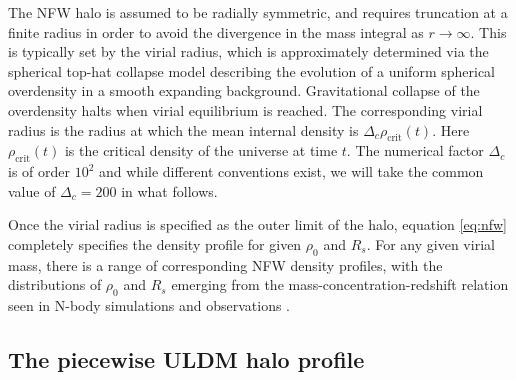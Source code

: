 \documentclass[a4paper,11pt]{article}
\begin{document}
The NFW halo is assumed to be radially symmetric, and requires truncation at a finite radius in order to avoid the divergence in the mass integral as $r\rightarrow \infty$. This is typically set by the virial radius, which is approximately determined via the spherical top-hat collapse model \cite{White:2000jv, Suto:2015jdt, Herrera:2017epn} describing the evolution of a uniform spherical overdensity in a smooth expanding background. Gravitational collapse of the overdensity halts when virial equilibrium is reached. The corresponding virial radius is the radius at which the mean internal density is $\Delta_c \rho_\mathrm{crit}(t)$. Here $\rho_\mathrm{crit}(t)$ is the critical density of the universe at time $t$. The numerical factor $\Delta_c$ is of order $10^2$ and while different conventions exist, we will take the common value of $\Delta_c = 200$ \cite{Richings:2018} in what follows. 

Once the virial radius is specified as the outer limit of the halo, equation \ref{eq:nfw} completely specifies the density profile for given  $\rho_0$ and $R_s$. For any given virial mass, there is a range of corresponding NFW density profiles, with the distributions of $\rho_0$ and $R_s$ emerging from the mass-concentration-redshift relation seen in N-body simulations and observations \cite{Ludlow:2013vxa, Ragagnin:2018enf}. 

\subsection{The piecewise ULDM halo profile}
\end{document}
